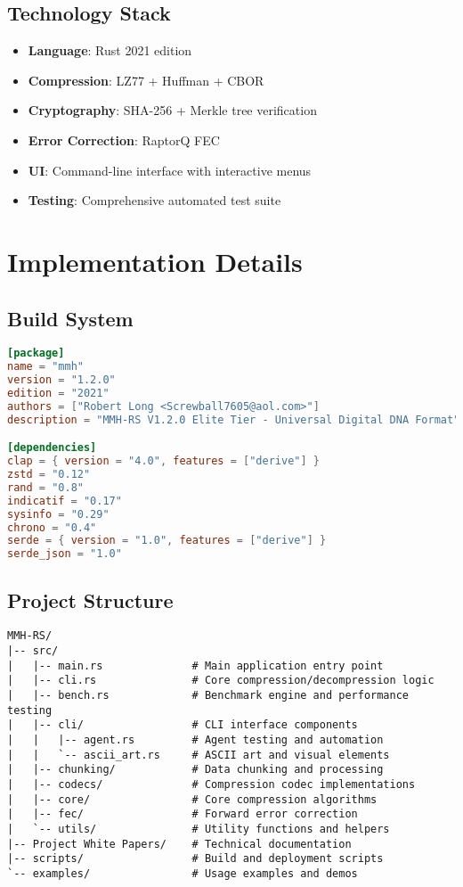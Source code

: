 \documentclass[12pt,a4paper]{article}
\begin{document}
\subsection{Technology Stack}
\begin{itemize}
    \item \textbf{Language}: Rust 2021 edition
    \item \textbf{Compression}: LZ77 + Huffman + CBOR
    \item \textbf{Cryptography}: SHA-256 + Merkle tree verification
    \item \textbf{Error Correction}: RaptorQ FEC
    \item \textbf{UI}: Command-line interface with interactive menus
    \item \textbf{Testing}: Comprehensive automated test suite
\end{itemize}

\newpage

\section{Implementation Details}

\subsection{Build System}
\begin{lstlisting}[language=TOML, caption=Cargo Configuration]
[package]
name = "mmh"
version = "1.2.0"
edition = "2021"
authors = ["Robert Long <Screwball7605@aol.com>"]
description = "MMH-RS V1.2.0 Elite Tier - Universal Digital DNA Format"

[dependencies]
clap = { version = "4.0", features = ["derive"] }
zstd = "0.12"
rand = "0.8"
indicatif = "0.17"
sysinfo = "0.29"
chrono = "0.4"
serde = { version = "1.0", features = ["derive"] }
serde_json = "1.0"
\end{lstlisting}

\subsection{Project Structure}
\begin{lstlisting}[caption=Directory Structure]
MMH-RS/
|-- src/
|   |-- main.rs              # Main application entry point
|   |-- cli.rs               # Core compression/decompression logic
|   |-- bench.rs             # Benchmark engine and performance testing
|   |-- cli/                 # CLI interface components
|   |   |-- agent.rs         # Agent testing and automation
|   |   `-- ascii_art.rs     # ASCII art and visual elements
|   |-- chunking/            # Data chunking and processing
|   |-- codecs/              # Compression codec implementations
|   |-- core/                # Core compression algorithms
|   |-- fec/                 # Forward error correction
|   `-- utils/               # Utility functions and helpers
|-- Project White Papers/    # Technical documentation
|-- scripts/                 # Build and deployment scripts
`-- examples/                # Usage examples and demos
\end{lstlisting}
\end{document}

